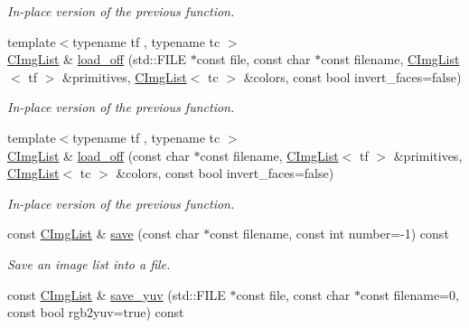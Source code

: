 \begin{DoxyCompactItemize}
\begin{DoxyCompactList}\small\item\em In-\/place version of the previous function. \end{DoxyCompactList}\item 
\hypertarget{structcimg__library_1_1_c_img_list_a6754ac0fa581f56a510f27b3912ba39e}{{\footnotesize template$<$typename tf , typename tc $>$ }\\\hyperlink{structcimg__library_1_1_c_img_list}{C\-Img\-List} \& \hyperlink{structcimg__library_1_1_c_img_list_a6754ac0fa581f56a510f27b3912ba39e}{load\-\_\-off} (std\-::\-F\-I\-L\-E $\ast$const file, const char $\ast$const filename, \hyperlink{structcimg__library_1_1_c_img_list}{C\-Img\-List}$<$ tf $>$ \&primitives, \hyperlink{structcimg__library_1_1_c_img_list}{C\-Img\-List}$<$ tc $>$ \&colors, const bool invert\-\_\-faces=false)}\label{structcimg__library_1_1_c_img_list_a6754ac0fa581f56a510f27b3912ba39e}

\begin{DoxyCompactList}\small\item\em In-\/place version of the previous function. \end{DoxyCompactList}\item 
\hypertarget{structcimg__library_1_1_c_img_list_a78296165341725478bdeabaafb689023}{{\footnotesize template$<$typename tf , typename tc $>$ }\\\hyperlink{structcimg__library_1_1_c_img_list}{C\-Img\-List} \& \hyperlink{structcimg__library_1_1_c_img_list_a78296165341725478bdeabaafb689023}{load\-\_\-off} (const char $\ast$const filename, \hyperlink{structcimg__library_1_1_c_img_list}{C\-Img\-List}$<$ tf $>$ \&primitives, \hyperlink{structcimg__library_1_1_c_img_list}{C\-Img\-List}$<$ tc $>$ \&colors, const bool invert\-\_\-faces=false)}\label{structcimg__library_1_1_c_img_list_a78296165341725478bdeabaafb689023}

\begin{DoxyCompactList}\small\item\em In-\/place version of the previous function. \end{DoxyCompactList}\item 
const \hyperlink{structcimg__library_1_1_c_img_list}{C\-Img\-List} \& \hyperlink{structcimg__library_1_1_c_img_list_ae1b9c55022579c04193de0342987acef}{save} (const char $\ast$const filename, const int number=-\/1) const 
\begin{DoxyCompactList}\small\item\em Save an image list into a file. \end{DoxyCompactList}\item 
\hypertarget{structcimg__library_1_1_c_img_list_aede555bb2df9d7128286e7605f806e43}{const \hyperlink{structcimg__library_1_1_c_img_list}{C\-Img\-List} \& \hyperlink{structcimg__library_1_1_c_img_list_aede555bb2df9d7128286e7605f806e43}{save\-\_\-yuv} (std\-::\-F\-I\-L\-E $\ast$const file, const char $\ast$const filename=0, const bool rgb2yuv=true) const }\label{structcimg__library_1_1_c_img_list_aede555bb2df9d7128286e7605f806e43}


\end{DoxyCompactItemize}
